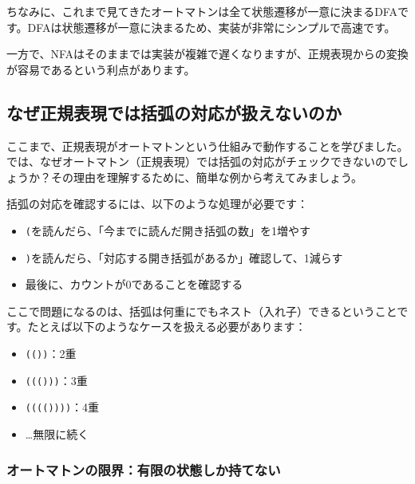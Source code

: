 ちなみに、これまで見てきたオートマトンは全て状態遷移が一意に決まるDFAです。DFAは状態遷移が一意に決まるため、実装が非常にシンプルで高速です。

一方で、NFAはそのままでは実装が複雑で遅くなりますが、正規表現からの変換が容易であるという利点があります。

\hypertarget{chapter4-ux306aux305cux6b63ux898fux8868ux73feux3067ux306fux62ecux5f27ux306eux5bfeux5fdcux304cux6271ux3048ux306aux3044ux306eux304b}{%
\subsection{なぜ正規表現では括弧の対応が扱えないのか}\label{chapter4-ux306aux305cux6b63ux898fux8868ux73feux3067ux306fux62ecux5f27ux306eux5bfeux5fdcux304cux6271ux3048ux306aux3044ux306eux304b}}

ここまで、正規表現がオートマトンという仕組みで動作することを学びました。では、なぜオートマトン（正規表現）では括弧の対応がチェックできないのでしょうか？その理由を理解するために、簡単な例から考えてみましょう。

括弧の対応を確認するには、以下のような処理が必要です：

\begin{itemize}
\tightlist
\item
  \texttt{(}を読んだら、「今までに読んだ開き括弧の数」を1増やす
\item
  \texttt{)}を読んだら、「対応する開き括弧があるか」確認して、1減らす
\item
  最後に、カウントが0であることを確認する
\end{itemize}

ここで問題になるのは、括弧は何重にでもネスト（入れ子）できるということです。たとえば以下のようなケースを扱える必要があります：

\begin{itemize}
\tightlist
\item
  \texttt{(())}：2重
\item
  \texttt{((()))}：3重\\
\item
  \texttt{(((())))}：4重
\item
  \ldots 無限に続く
\end{itemize}

\hypertarget{chapter4-ux30aaux30fcux30c8ux30deux30c8ux30f3ux306eux9650ux754cux6709ux9650ux306eux72b6ux614bux3057ux304bux6301ux3066ux306aux3044}{%
\subsubsection{オートマトンの限界：有限の状態しか持てない}\label{chapter4-ux30aaux30fcux30c8ux30deux30c8ux30f3ux306eux9650ux754cux6709ux9650ux306eux72b6ux614bux3057ux304bux6301ux3066ux306aux3044}}

